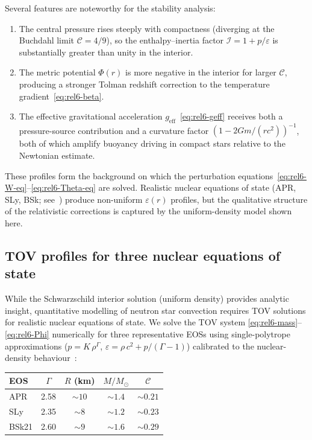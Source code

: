 Several features are noteworthy for the stability analysis:
\begin{enumerate}
\item[(i)] The central pressure rises steeply with compactness
  (diverging at the Buchdahl limit $\mathcal{C} = 4/9$), so
  the enthalpy--inertia factor $\mathcal{I} = 1 + p/\varepsilon$
  is substantially greater than unity in the interior.

\item[(ii)] The metric potential $\Phi(r)$ is more negative in
  the interior for larger $\mathcal{C}$, producing a stronger
  Tolman redshift correction to the temperature
  gradient~\eqref{eq:rel6-beta}.

\item[(iii)] The effective gravitational acceleration
  $g_{\mathrm{eff}}$~\eqref{eq:rel6-geff} receives both a
  pressure-source contribution and a curvature factor
  $(1-2Gm/(rc^{2}))^{-1}$, both of which amplify buoyancy
  driving in compact stars relative to the Newtonian estimate.
\end{enumerate}

These profiles form the background on which the perturbation
equations~\eqref{eq:rel6-W-eq}--\eqref{eq:rel6-Theta-eq} are
solved.  Realistic nuclear equations of state (APR, SLy, BSk;
see~\cite{Lattimer2001,HaenselPotekhinYakovlev2007}) produce non-uniform
$\varepsilon(r)$ profiles, but the qualitative structure of the
relativistic corrections is captured by the uniform-density model
shown here.

\subsection{TOV profiles for three nuclear equations of state}
\label{subsec:rel-56-tov-3eos}

While the Schwarzschild interior solution (uniform density)
provides analytic insight, quantitative modelling of neutron star
convection requires TOV solutions for realistic nuclear equations
of state.  We solve the TOV system
\eqref{eq:rel6-mass}--\eqref{eq:rel6-Phi} numerically for three
representative EOSs using single-polytrope approximations
($p = K\,\rho^{\Gamma}$, $\varepsilon = \rho\,c^{2} +
p/(\Gamma - 1)$) calibrated to the nuclear-density
behaviour~\cite{AkmalPR1998,DouchinHaensel2001,PotekhinEtAl2013}:

\begin{center}
\begin{tabular}{lcccc}
\hline
EOS & $\Gamma$ & $R$ (km) & $M/M_{\odot}$ & $\mathscr{C}$ \\
\hline
APR  & 2.58 & $\sim 10$   & $\sim 1.4$ & $\sim 0.21$ \\
SLy  & 2.35 & $\sim 8$    & $\sim 1.2$ & $\sim 0.23$ \\
BSk21 & 2.60 & $\sim 9$   & $\sim 1.6$ & $\sim 0.29$ \\
\hline
\end{tabular}
\end{center}


